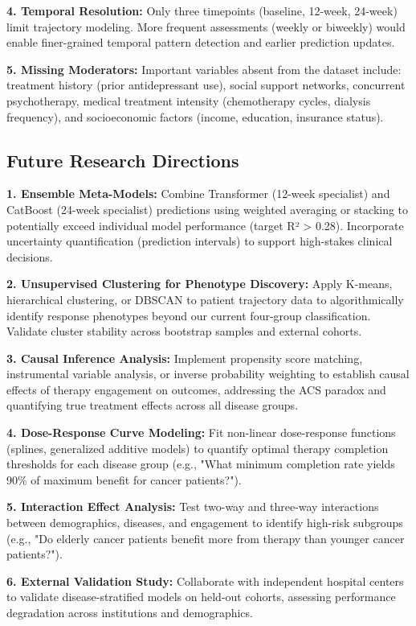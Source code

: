 \documentclass[conference]{IEEEtran}
\begin{document}
\textbf{4. Temporal Resolution:} Only three timepoints (baseline, 12-week, 24-week) limit trajectory modeling. More frequent assessments (weekly or biweekly) would enable finer-grained temporal pattern detection and earlier prediction updates.

\textbf{5. Missing Moderators:} Important variables absent from the dataset include: treatment history (prior antidepressant use), social support networks, concurrent psychotherapy, medical treatment intensity (chemotherapy cycles, dialysis frequency), and socioeconomic factors (income, education, insurance status).

\subsection{Future Research Directions}

\textbf{1. Ensemble Meta-Models:} Combine Transformer (12-week specialist) and CatBoost (24-week specialist) predictions using weighted averaging or stacking to potentially exceed individual model performance (target R² > 0.28). Incorporate uncertainty quantification (prediction intervals) to support high-stakes clinical decisions.

\textbf{2. Unsupervised Clustering for Phenotype Discovery:} Apply K-means, hierarchical clustering, or DBSCAN to patient trajectory data to algorithmically identify response phenotypes beyond our current four-group classification. Validate cluster stability across bootstrap samples and external cohorts.

\textbf{3. Causal Inference Analysis:} Implement propensity score matching, instrumental variable analysis, or inverse probability weighting to establish causal effects of therapy engagement on outcomes, addressing the ACS paradox and quantifying true treatment effects across all disease groups.

\textbf{4. Dose-Response Curve Modeling:} Fit non-linear dose-response functions (splines, generalized additive models) to quantify optimal therapy completion thresholds for each disease group (e.g., "What minimum completion rate yields 90\% of maximum benefit for cancer patients?").

\textbf{5. Interaction Effect Analysis:} Test two-way and three-way interactions between demographics, diseases, and engagement to identify high-risk subgroups (e.g., "Do elderly cancer patients benefit more from therapy than younger cancer patients?").

\textbf{6. External Validation Study:} Collaborate with independent hospital centers to validate disease-stratified models on held-out cohorts, assessing performance degradation across institutions and demographics.
\end{document}
